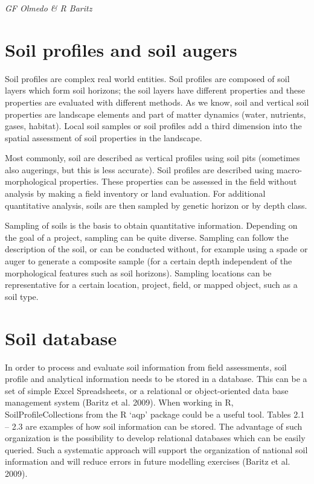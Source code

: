 \documentclass[]{book}
\theoremstyle{definition}
\theoremstyle{definition}
\theoremstyle{definition}
\theoremstyle{remark}
\begin{document}
\emph{GF Olmedo \& R Baritz}

\section{Soil profiles and soil
augers}\label{soil-profiles-and-soil-augers}

Soil profiles are complex real world entities. Soil profiles are
composed of soil layers which form soil horizons; the soil layers have
different properties and these properties are evaluated with different
methods. As we know, soil and vertical soil properties are landscape
elements and part of matter dynamics (water, nutrients, gases, habitat).
Local soil samples or soil profiles add a third dimension into the
spatial assessment of soil properties in the landscape.

Most commonly, soil are described as vertical profiles using soil pits
(sometimes also augerings, but this is less accurate). Soil profiles are
described using macro-morphological properties. These properties can be
assessed in the field without analysis by making a field inventory or
land evaluation. For additional quantitative analysis, soils are then
sampled by genetic horizon or by depth class.

Sampling of soils is the basis to obtain quantitative information.
Depending on the goal of a project, sampling can be quite diverse.
Sampling can follow the description of the soil, or can be conducted
without, for example using a spade or auger to generate a composite
sample (for a certain depth independent of the morphological features
such as soil horizons). Sampling locations can be representative for a
certain location, project, field, or mapped object, such as a soil type.

\section{Soil database}\label{soil-database}

In order to process and evaluate soil information from field
assessments, soil profile and analytical information needs to be stored
in a database. This can be a set of simple Excel Spreadsheets, or a
relational or object-oriented data base management system (Baritz et al.
2009). When working in R, SoilProfileCollections from the R `aqp'
package could be a useful tool. Tables 2.1 -- 2.3 are examples of how
soil information can be stored. The advantage of such organization is
the possibility to develop relational databases which can be easily
queried. Such a systematic approach will support the organization of
national soil information and will reduce errors in future modelling
exercises (Baritz et al. 2009).
\end{document}

